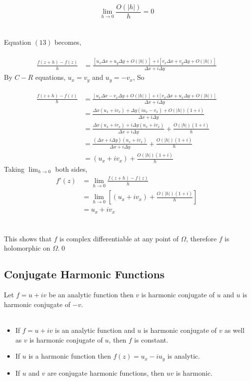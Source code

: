 \documentclass{article}
\begin{document}
\[
\boxed{\lim_{h\to 0}\frac{O(|h|)}{h}=0}
\]
\\
\\
Equation $(13)$ becomes,
\\
\\
\begin{align}
    \frac{f(z+h)-f(z)}{h}&=\frac{[u_x\Delta x+u_y\Delta y+O(|h|)]+i[v_x\Delta x+v_y\Delta y+O(|h|)]}{\Delta x+i\Delta y}
\end{align}
By $C-R$ equations, $u_x=v_y$ and $u_y=-v_x$,
So
\\
\\
\begin{align}
    \frac{f(z+h)-f(z)}{h}&=\frac{[u_x\Delta x-v_x\Delta y+O(|h|)]+i[v_x\Delta x+u_x\Delta y+O(|h|)]}{\Delta x+i\Delta y} \\
    &=\frac{\Delta x(u_x+iv_x)+\Delta y(iu_x-v_x)+O(|h|)(1+i)}{\Delta x+i\Delta y}\\
    &=\frac{\Delta x(u_x+iv_x)+i\Delta y(u_x+iv_x)}{\Delta x+i\Delta y}+\frac{O(|h|)(1+i)}{h}\\
    &=\frac{(\Delta x+i\Delta y)(u_x+iv_x)}{\Delta x+i\Delta y}+\frac{O(|h|)(1+i)}{h}\\
    &=(u_x+iv_x)+\frac{O(|h|)(1+i)}{h}
\end{align}
Taking $\lim_{h\to 0}$ both sides,
\begin{align}
    f'(z)&=\lim_{h\to 0}\frac{f(z+h)-f(z)}{h} \\
    &= \lim_{h\to 0}[(u_x+iv_x)+\frac{O(|h|)(1+i)}{h}] \\
    &=u_x+iv_x
\end{align}
\\
\\
This shows that $f$ is complex differentiable at any point of $\Omega$, therefore $f$ is holomorphic on $\Omega$.\qed
\newpage
\subsection{Conjugate Harmonic Functions}
Let $f=u+iv$ be an analytic function then $v$ is harmonic conjugate of $u$ and $u$ is harmonic conjugate of $-v$.
\\
\\
\begin{itemize}
    \item If $f=u+iv$ is an analytic function and $u$ is harmonic conjugate  of $v$ as well as $v$ is harmonic conjugate of $u$, then $f$ is constant.
    \item If $u$ is a harmonic function then $f(z)=u_x-iu_y$ is analytic.
    \item If $u$ and $v$ are conjugate harmonic functions, then $uv$ is harmonic.
\end{itemize}
\end{document}
